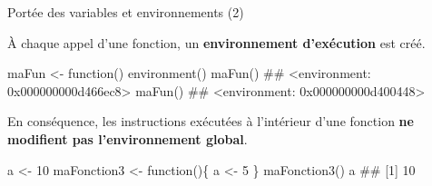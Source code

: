\documentclass[12pt,ignorenonframetext,]{beamer}
\newenvironment{Shaded}{}{}
\newcommand{\ControlFlowTok}[1]{\textcolor[rgb]{0.00,0.00,1.00}{#1}}
\newcommand{\DecValTok}[1]{#1}
\newcommand{\KeywordTok}[1]{\textcolor[rgb]{0.00,0.00,1.00}{#1}}
\newcommand{\NormalTok}[1]{#1}
\newcommand{\StringTok}[1]{\textcolor[rgb]{0.00,0.50,0.50}{#1}}
\renewenvironment{Shaded}{\begin{snugshade}}{\end{snugshade}}
\begin{document}
\begin{frame}[fragile]{\large Portée des variables et environnements
(2)}
\protect\hypertarget{portee-des-variables-et-environnements-2}{}

\small

À chaque appel d’une fonction, un \textbf{environnement d’exécution} est
créé.

\footnotesize

\begin{Shaded}
\begin{Highlighting}[]
\NormalTok{maFun <-}\StringTok{ }\ControlFlowTok{function}\NormalTok{() }\KeywordTok{environment}\NormalTok{()}
\KeywordTok{maFun}\NormalTok{()}
\NormalTok{  ## <environment: 0x000000000d466ec8>}
\KeywordTok{maFun}\NormalTok{()}
\NormalTok{  ## <environment: 0x000000000d400448>}
\end{Highlighting}
\end{Shaded}

\pause \small

En conséquence, les instructions exécutées à l’intérieur d’une fonction
\textbf{ne modifient pas l’environnement global}.

\footnotesize

\begin{Shaded}
\begin{Highlighting}[]
\NormalTok{a <-}\StringTok{ }\DecValTok{10}
\NormalTok{maFonction3 <-}\StringTok{ }\ControlFlowTok{function}\NormalTok{()\{}
\NormalTok{  a <-}\StringTok{ }\DecValTok{5}
\NormalTok{\}}
\KeywordTok{maFonction3}\NormalTok{()}
\NormalTok{a}
\NormalTok{  ## [1] 10}
\end{Highlighting}
\end{Shaded}

\end{frame}
\end{document}
